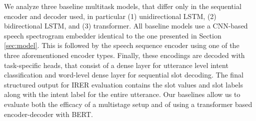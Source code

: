 We analyze three baseline multitask models, that differ only in the sequential encoder and decoder used, in particular (1) unidirectional LSTM, (2) bidirectional LSTM, and (3) transformer. All baseline models use a CNN-based speech spectrogram embedder identical to the one presented in Section \ref{sec:model}. This is followed by the speech sequence encoder using one of the three aforementioned encoder types. Finally, these encodings are decoded with task-specific heads, that consist of a dense layer for utterance level intent classification and word-level dense layer for sequential slot decoding. The final structured output for IRER evaluation contains the slot values and slot labels along with the intent label for the entire utterance. 
Our baselines allow us to evaluate both the efficacy of a multistage setup and of using a transformer based encoder-decoder with BERT.


